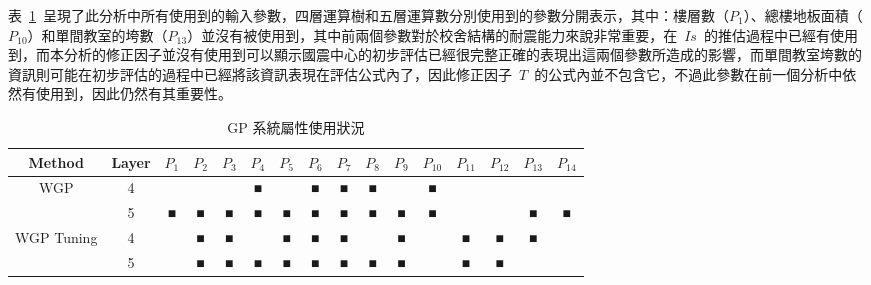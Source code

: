 表~\ref{tab:gp-attributes}~呈現了此分析中所有使用到的輸入參數，四層運算樹和五層運算數分別使用到的參數分開表示，其中：樓層數（$P_1$）、總樓地板面積（$P_{10}$）和單間教室的垮數（$P_{13}$）並沒有被使用到，其中前兩個參數對於校舍結構的耐震能力來說非常重要，在~$Is$~的推估過程中已經有使用到，而本分析的修正因子並沒有使用到可以顯示國震中心的初步評估已經很完整正確的表現出這兩個參數所造成的影響，而單間教室垮數的資訊則可能在初步評估的過程中已經將該資訊表現在評估公式內了，因此修正因子~$T$~的公式內並不包含它，不過此參數在前一個分析中依然有使用到，因此仍然有其重要性。

{\renewcommand{\arraystretch}{1.5}
\begin{table}[hbtp]
  \begin{center}
    \caption{GP 系統屬性使用狀況}
    \label{tab:gp-attributes}
    \scriptsize
    \begin{tabular}{c c c c c c c c c c c c c c c c}
      \hline
      Method & Layer & $P_1$ & $P_2$ & $P_3$ & $P_4$ & $P_5$ & $P_6$ & $P_7$ & $P_8$ & $P_9$ & $P_{10}$ & $P_{11}$ & $P_{12}$ & $P_{13}$ & $P_{14}$ \\
      \hline
      \multirow{2}{*}{WGP} & 4  &  &  &  & ■ &  & ■ & ■ & ■ &  & ■ &  &  &  &  \\
       & 5  & ■ & ■ & ■ & ■ & ■ & ■ & ■ & ■ & ■ & ■ &  &  & ■ & ■ \\
      \multirow{2}{*}{WGP Tuning} & 4 &  & ■ & ■ &  & ■ & ■ & ■ &  & ■ &  & ■ & ■ & ■ &  \\
       & 5  &  & ■ & ■ & ■ & ■ & ■ & ■ & ■ & ■ &  & ■ & ■ &  &  \\
      \hline
      \end{tabular}
  \end{center}
\end{table}
}




